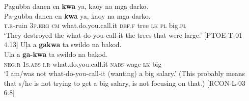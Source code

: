 \ea 
\label{bkm:Ref329764949}
Pagubba  danen  en  \textbf{kwa}  ya,  kaoy  na  mga  darko. \\\smallskip
\gll Pa-gubba  danen  en  \textbf{kwa}  ya,  kaoy  na  mga  darko. \\
\textsc{t.r}-ruin  3\textsc{p.erg}  \textsc{cm}  what.do.you.call.it  \textsc{def.f}  tree  \textsc{lk}  \textsc{pl}  big.\textsc{pl} \\
\glt ‘They destroyed the what-do-you-call-it the trees that were large.’ [PTOE-T-01 4.13]
\z
\ea
\label{bkm:Ref441497341}
Uļa  a  \textbf{gakwa}  ta  swildo  na  bakod. \\\smallskip
\gll Uļa  a  \textbf{ga-kwa}  ta  swildo  na  bakod. \\
\textsc{neg.r}  1\textsc{s.abs}  \textsc{i.r}-what.do.you.call.it  \textsc{nabs}  wage  \textsc{lk}  big \\
\glt ‘I am/was not what-do-you-call-it (wanting) a big salary.’ (This probably means that s/he is not trying to get a big salary, is not focusing on that.) [RCON-L-03 6.8]
\z


